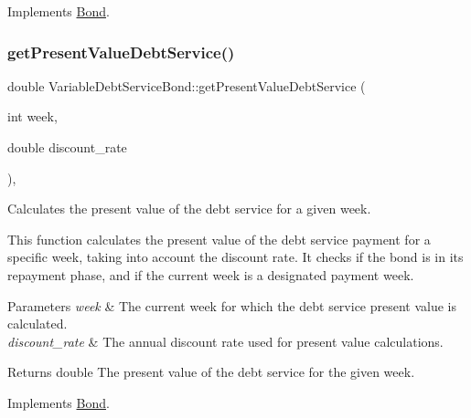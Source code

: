 Implements \mbox{\hyperlink{classBond_a5997278813deb16aa5d01bbca8ecc7b2}{Bond}}.

\mbox{\label{classVariableDebtServiceBond_aa5ad4fcc7c65154105388b332ae98198}} 
\subsubsection{\texorpdfstring{get\+Present\+Value\+Debt\+Service()}{getPresentValueDebtService()}}
{\footnotesize\ttfamily double Variable\+Debt\+Service\+Bond\+::get\+Present\+Value\+Debt\+Service (\begin{DoxyParamCaption}\item[{int}]{week,  }\item[{double}]{discount\+\_\+rate }\end{DoxyParamCaption})\hspace{0.3cm}{\ttfamily [override]}, {\ttfamily [virtual]}}



Calculates the present value of the debt service for a given week. 

This function calculates the present value of the debt service payment for a specific week, taking into account the discount rate. It checks if the bond is in its repayment phase, and if the current week is a designated payment week.


\begin{DoxyParams}{Parameters}
{\em week} & The current week for which the debt service present value is calculated. \\
\hline
{\em discount\+\_\+rate} & The annual discount rate used for present value calculations.\\
\hline
\end{DoxyParams}
\begin{DoxyReturn}{Returns}
double The present value of the debt service for the given week. 
\end{DoxyReturn}


Implements \mbox{\hyperlink{classBond_a322d4ab0c0c72824ac4df5df80f14d24}{Bond}}.

\mbox{\label{classVariableDebtServiceBond_a3edee29f26e8ac74f9767770c6a951c9}} 
